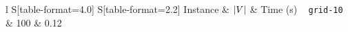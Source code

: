 \documentclass{article}
\DeclarePairedDelimiter{\abs}{\lvert}{\rvert}
\begin{document}
\begin{tabular}{l S[table-format=4.0] S[table-format=2.2]}
  \toprule
  Instance & {$\abs{V}$} & {Time (s)} \
  \midrule
  \texttt{grid-10} &  100 &  0.12 \
  \bottomrule
\end{tabular}
\end{document}
